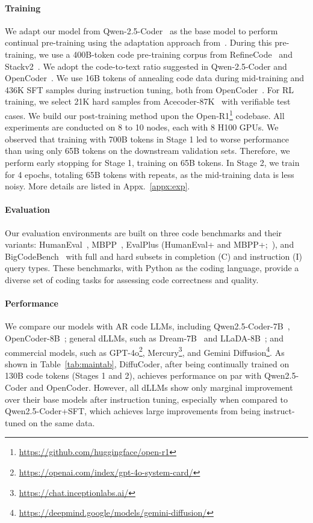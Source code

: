 \paragraph{Training} We adapt our model from Qwen-2.5-Coder~\citep{hui2024qwen2} as the base model to perform continual pre-training using the adaptation approach from~\citet{gong2025scaling}.
During this pre-training, we use a 400B-token code pre-training corpus from 
RefineCode~\citep{huang2024opencoder}
and Stackv2~\citep{lozhkov2024starcoder}. We adopt the code-to-text ratio suggested in Qwen-2.5-Coder and OpenCoder~\citep{huang2024opencoder}. 
We use 16B tokens of annealing code data during mid-training and 436K SFT samples during instruction tuning, both from OpenCoder~\citep{huang2024opencoder}. For RL training, we select 21K hard samples from Acecoder-87K~\citep{zeng2025acecoder} with verifiable test cases. We build our post-training method upon the Open-R1\footnote{\url{https://github.com/huggingface/open-r1}} codebase. All experiments are conducted on 8 to 10 nodes, each with 8 H100 GPUs. 
We observed that training with 700B tokens in Stage 1 led to worse performance than using only 65B tokens on the downstream validation sets. Therefore, we perform early stopping for Stage 1, training on 65B tokens. In Stage 2, we train for 4 epochs, totaling 65B tokens with repeats, as the mid-training data is less noisy. 
More details are listed in Appx.~\ref{appx:exp}.
\paragraph{Evaluation}
Our evaluation environments are built on three code benchmarks and their variants: HumanEval~\citep{chen2021evaluating}, MBPP~\citep{austin2021program}, EvalPlus (HumanEval+ and MBPP+;~\citealt{liu2023your}), and BigCodeBench~\citep{zhuo2024bigcodebench} with full and hard subsets in completion (C) and instruction (I) query types. 
These benchmarks, with Python as the coding language, provide a diverse set of coding tasks for assessing code correctness and quality.
\paragraph{Performance} We compare our models with AR code LLMs, including Qwen2.5-Coder-7B~\citep{hui2024qwen2}, OpenCoder-8B~\citep{huang2024opencoder}; general dLLMs, such as Dream-7B~\citep{dream2025} and LLaDA-8B~\citep{li2025llada}; and commercial models, such as GPT-4o\footnote{\url{https://openai.com/index/gpt-4o-system-card/}}, Mercury\footnote{\url{https://chat.inceptionlabs.ai/}}, and Gemini Diffusion\footnote{\url{https://deepmind.google/models/gemini-diffusion/}}. 
As shown in Table~\ref{tab:maintab}, DiffuCoder, after being continually trained on 130B code tokens (Stages 1 and 2), achieves performance on par with Qwen2.5-Coder and OpenCoder. 
However, all dLLMs show only marginal improvement over their base models after instruction tuning, especially when compared to Qwen2.5-Coder+SFT, which achieves large improvements from being instruct-tuned on the same data. 

